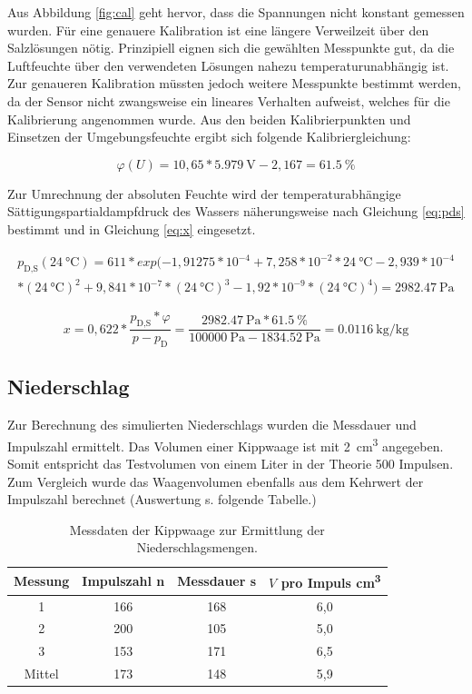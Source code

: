 Aus Abbildung \ref{fig:cal} geht hervor, dass die Spannungen nicht konstant gemessen wurden. Für eine genauere Kalibration ist eine längere Verweilzeit über den Salzlösungen nötig. Prinzipiell eignen sich die gewählten Messpunkte gut, da die Luftfeuchte über den verwendeten Lösungen nahezu temperaturunabhängig ist. Zur genaueren Kalibration müssten jedoch weitere Messpunkte bestimmt werden, da der Sensor nicht zwangsweise ein lineares Verhalten aufweist, welches für die Kalibrierung angenommen wurde. Aus den beiden Kalibrierpunkten und Einsetzen der Umgebungsfeuchte ergibt sich folgende Kalibriergleichung:

\begin{equation}
	\label{eq:cal}
	\varphi(U)=10,65*\SI{5,979}{\volt}-2,167=\SI{61,5}{\percent}
\end{equation}

Zur Umrechnung der absoluten Feuchte wird der temperaturabhängige Sättigungspartialdampfdruck des Wassers näherungsweise nach Gleichung \ref{eq:pds} bestimmt und in Gleichung \ref{eq:x} eingesetzt. 

\begin{multline}
	\label{eq:pds}
	p_{\text{D,S}}(\SI{24}{\celsius}) = 611*exp(-1,91275*10^{-4}+7,258*10^{-2}*\SI{24}{\celsius}-2,939*10^{-4}\\*(\SI{24}{\celsius})^2 +9,841*10^{-7}*(\SI{24}{\celsius})^3-1,92*10^{-9}*(\SI{24}{\celsius})^4)=\SI{2982,47}{\pascal}
\end{multline}

\begin{equation}
	\label{eq:x}
	x=0,622*\frac{p_{\text{D,S}}*\varphi}{p-p_{\text{D}}}=\frac{\SI{2982,47}{\pascal}*\SI{61,5}{\percent}}{\SI{100000}{\pascal}-\SI{1834,52}{\pascal}}=\SI{0,0116}{\kilogram\per\kilogram}
\end{equation}

		
\subsection{Niederschlag}
Zur Berechnung des simulierten Niederschlags wurden die Messdauer und Impulszahl ermittelt. Das Volumen einer Kippwaage ist mit \SI{2}{\cubic\centi\meter} angegeben. Somit entspricht das Testvolumen von einem Liter in der Theorie 500 Impulsen. Zum Vergleich wurde das Waagenvolumen ebenfalls aus dem Kehrwert der Impulszahl berechnet (Auswertung s. folgende Tabelle.)

 \begin{table}
 	\centering
 	\caption{Messdaten der Kippwaage zur Ermittlung der Niederschlagsmengen.}
 	\label{tab:rain}
 	\begin{tabular}{cccc}
 		\toprule
 		\textbf{Messung} & \textbf{Impulszahl} n & \textbf{Messdauer} s & \textbf{$V$ pro Impuls} \si{\cubic\centi\meter}\\
 		\midrule
 		1 & 166 & 168  & 6,0\\
 		2 & 200 & 105  & 5,0\\
 		3 & 153 & 171  & 6,5\\
 		Mittel & 173 & 148  & 5,9\\
 		\bottomrule
 	\end{tabular}
 \end{table}


